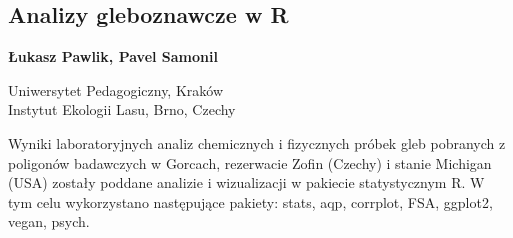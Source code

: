 \documentclass[\main/boa.tex]{subfiles}
\begin{document}
\subsection{Analizy gleboznawcze w R}

\begin{minipage}{0.915\textwidth}
	\centering
  {\bf {} Łukasz Pawlik,  Pavel Samonil}
\end{minipage}

\begin{affiliations}
\begin{minipage}{0.915\textwidth}
\centering
Uniwersytet Pedagogiczny, Kraków  \\[-2pt]
Instytut Ekologii Lasu, Brno, Czechy  \\[-2pt]
\end{minipage}
\end{affiliations}

\vskip 0.3cm

 Wyniki laboratoryjnych analiz chemicznych i fizycznych próbek gleb pobranych \break z poligonów badawczych w Gorcach, rezerwacie Zofin (Czechy) i stanie Michigan (USA) zostały poddane analizie i wizualizacji w pakiecie statystycznym R. W tym celu wykorzystano następujące pakiety: stats, aqp, corrplot, FSA, ggplot2, vegan, psych. 
\end{document}
